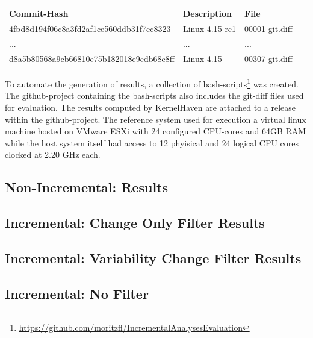 \documentclass[a4paper]{article}
\begin{document}
\begin{tabular}{l | l | l}
	Commit-Hash & Description & File \\ \hline
	4fbd8d194f06c8a3fd2af1ce560ddb31f7ec8323 & Linux 4.15-rc1 & 00001-git.diff \\
	... & ... & ... \\
	d8a5b80568a9cb66810e75b182018e9edb68e8ff & Linux 4.15  & 00307-git.diff \\
\end{tabular}

To automate the generation of results, a collection of bash-scripts\footnote{\url{https://github.com/moritzfl/IncrementalAnalysesEvaluation}} was created. The github-project containing the bash-scripts also includes the git-diff files used for evaluation. The results computed by KernelHaven are attached to a release within the github-project. The reference system used for execution a virtual linux machine hosted on VMware ESXi \cite{ESXi-f0l} with 24 configured CPU-cores and 64GB RAM while the host system itself had access to 12 phyisical and 24 logical CPU cores clocked at 2.20 GHz each.

\subsection{Non-Incremental: Results}

\subsection{Incremental: Change Only Filter Results}

\subsection{Incremental: Variability Change Filter Results}

\subsection{Incremental: No Filter}


\newpage


\end{document}
